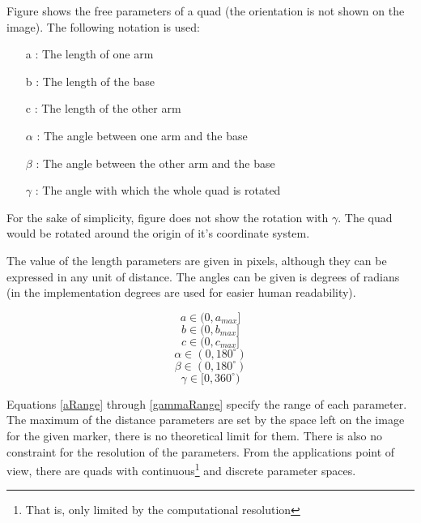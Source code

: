 Figure  shows the free parameters of a quad (the orientation is not shown on the image).
The following notation is used:
\begin{itemize}
	\item[a]: The length of one arm
	\item[b]: The length of the base
	\item[c]: The length of the other arm
	\item[$\alpha$]: The angle between one arm and the base
	\item[$\beta$]: The angle between the other arm and the base
	\item[$\gamma$]: The angle with which the whole quad is rotated
\end{itemize}
For the sake of simplicity, figure  does not show the rotation with $\gamma$.
The quad would be rotated around the origin of it's coordinate system.

The value of the length parameters are given in pixels, although they can be expressed in any unit of distance.
The angles can be given is degrees of radians (in the implementation degrees are used for easier human readability).

\begin{equation}
	a\in(0 , a_{max}]
	\label{eq:aRange}
\end{equation}
\begin{equation}
	b\in(0 , b_{max}]
	\label{eq:bRange}
\end{equation}
\begin{equation}
	c\in(0 , c_{max}]
	\label{eq:cRange}
\end{equation}
\begin{equation}
	\alpha\in(0 , 180^\circ)
	\label{eq:alphaRange}
\end{equation}
\begin{equation}
	\beta\in(0 , 180^\circ)
	\label{eq:betaRange}
\end{equation}
\begin{equation}
	\gamma\in[0 , 360^\circ)
	\label{eq:gammaRange}
\end{equation}

Equations \eqref{aRange} through \eqref{gammaRange} specify the range of each parameter.
The maximum of the distance parameters are set by the space left on the image for the given marker, there is no theoretical limit for them.
There is also no constraint for the resolution of the parameters.
From the applications point of view, there are quads with continuous\footnote{That is, only limited by the computational resolution} and discrete parameter spaces.

